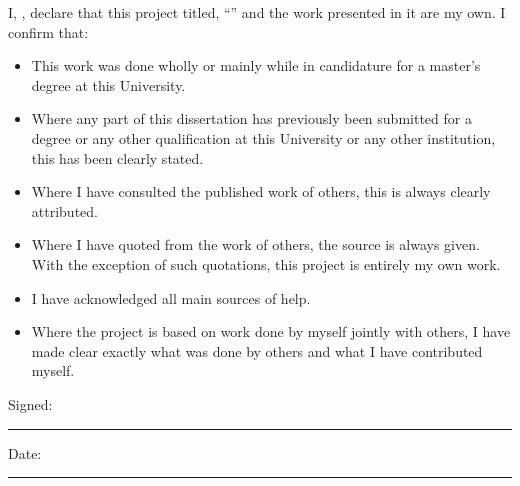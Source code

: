 \documentclass[
11pt,
oneside,
english,
singlespacing,
headsepline,
]{MastersDoctoralThesis}
\begin{document}

\begin{declaration}
\addchaptertocentry{\authorshipname} %
\noindent I, \authorname, declare that this project titled, \enquote{\ttitle} and the work presented in it are my own. I confirm that:

\begin{itemize} 
\item This work was done wholly or mainly while in candidature for a master's degree at this University.
\item Where any part of this dissertation has previously been submitted for a degree or any other qualification at this University or any other institution, this has been clearly stated.
\item Where I have consulted the published work of others, this is always clearly attributed.
\item Where I have quoted from the work of others, the source is always given. With the exception of such quotations, this project is entirely my own work.
\item I have acknowledged all main sources of help.
\item Where the project is based on work done by myself jointly with others, I have made clear exactly what was done by others and what I have contributed myself.
\end{itemize}
\vspace{5em}
\noindent Signed:\\
\rule[0.5em]{25em}{0.5pt} %
 
\noindent Date:\\
\rule[0.5em]{25em}{0.5pt} %
\end{declaration}

\cleardoublepage

% 

\end{document}
